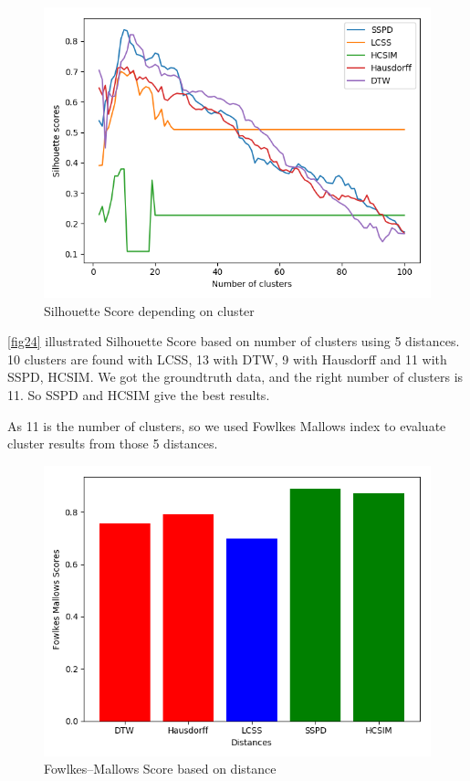 \documentclass[a4paper, 12pt]{article}
\begin{document}
\begin{figure}[ht]
    \centering
    \includegraphics[width=1\textwidth]{distance_compare.png}
    \caption{Silhouette Score depending on cluster}
    \label{fig24}
\end{figure}

\autoref{fig24} illustrated Silhouette Score based on number of clusters using 5 distances. 10 clusters are found with LCSS, 13 with DTW, 9 with Hausdorff and 11 with SSPD, HCSIM. We got the groundtruth data, and the right number of clusters is 11. So SSPD and HCSIM give the best results.

As 11 is the number of clusters, so we used Fowlkes Mallows index to evaluate cluster results from those 5 distances.

\begin{figure}[ht]
    \centering
    \includegraphics[width=1\textwidth]{fowlkes_mallows_score.png}
    \caption{Fowlkes–Mallows Score based on distance}
    \label{fig25}
\end{figure}
\end{document}
